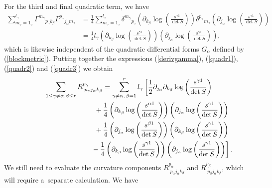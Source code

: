 \documentclass[11pt]{article}
\numberwithin{equation}{section}
\newcommand{\jalpha}{j_{\alpha}}
\newcommand{\kbeta}{k_{\beta}}
\newcommand{\pgamma}{p_{\gamma}}
\newcommand{\mgamma}{m_{\gamma}}
\newcommand{\palpha}{p_{\alpha}}
\newcommand{\pbeta}{p_{\beta}}
\newcommand{\lgamma}{l_{\gamma}}
\begin{document}
For the third and final quadratic term, we have
\begin{align}
\sum_{\mgamma=1_{\gamma}}^{\lgamma}{\Gamma^{\mgamma}}_{\pgamma \kbeta}{\Gamma^{\pgamma}}_{\jalpha \mgamma} &=\frac{1}{4}\sum_{\mgamma=1_{\gamma}}^{\lgamma}{\delta^{\mgamma}}_{\pgamma}\left(\partial_{\kbeta}\log\left(\frac{s^{\gamma 1}}{\det S}\right)\right){\delta^{\pgamma}}_{\mgamma}\left(\partial_{\jalpha}\log\left(\frac{s^{\gamma 1}}{\det S}\right)\right)\nonumber\\
&=\frac{1}{4}\lgamma \left(\partial_{\kbeta}\log\left(\frac{s^{\gamma 1}}{\det S}\right)\right)\left(\partial_{\jalpha}\log\left(\frac{s^{\gamma 1}}{\det S}\right)\right),\label{quadr3}
\end{align}
which is likewise independent of the quadratic differential forms $G_{\alpha}$ defined by (\ref{blockmetric}). Putting together the expressions (\ref{derivgamma}), (\ref{quadr1}), (\ref{quadr2}) and (\ref{quadr3}) we obtain
\begin{gather}
\sum_{1\leq \gamma \neq \alpha, \beta\leq r}R^{\pgamma}_{{\phantom l} \pgamma \jalpha \kbeta}=\sum_{\gamma \neq \alpha, \,\beta =1}^{r}l_{\gamma}\left[\frac{1}{2}\partial_{\jalpha}\partial_{\kbeta}\log\left(\frac{s^{\gamma 1}}{\det S}\right)\right.\nonumber\\
\hphantom{\sum_{1\leq \gamma \neq \alpha, \beta\leq r}R^{\pgamma}_{{\phantom l} \pgamma \jalpha \kbeta}=}{}
+\frac{1}{4}\left(\partial_{\kbeta}\log\left(\frac{s^{\alpha 1}}{\det S}\right)\right)\left(\partial_{\jalpha}\log\left(\frac{s^{\gamma 1}}{\det S}\right)\right)\nonumber\\
\hphantom{\sum_{1\leq \gamma \neq \alpha, \beta\leq r}R^{\pgamma}_{{\phantom l} \pgamma \jalpha \kbeta}=}{}
+ \frac{1}{4}\left(\partial_{\jalpha}\log\left(\frac{s^{\beta 1}}{\det S}\right)\right)\left(\partial_{\kbeta}\log\left(\frac{s^{\gamma 1}}{\det S}\right)\right)\nonumber\\
\left.\hphantom{\sum_{1\leq \gamma \neq \alpha, \beta\leq r}R^{\pgamma}_{{\phantom l} \pgamma \jalpha \kbeta}=}{}
-\frac{1}{4}\left(\partial_{\kbeta}\log\left(\frac{s^{\gamma 1}}{\det S}\right)\right)\left(\partial_{\jalpha}\log\left(\frac{s^{\gamma 1}}{\det S}\right)\right)\right].\label{Riccidecomp1}
\end{gather}
We still need to evaluate the curvature components $R^{\palpha}_{{\phantom l} \palpha \jalpha \kbeta}$ and $R^{\pbeta}_{{\phantom l} \pbeta \jalpha \kbeta}$, which will require a~separate calculation. We have
\end{document}
